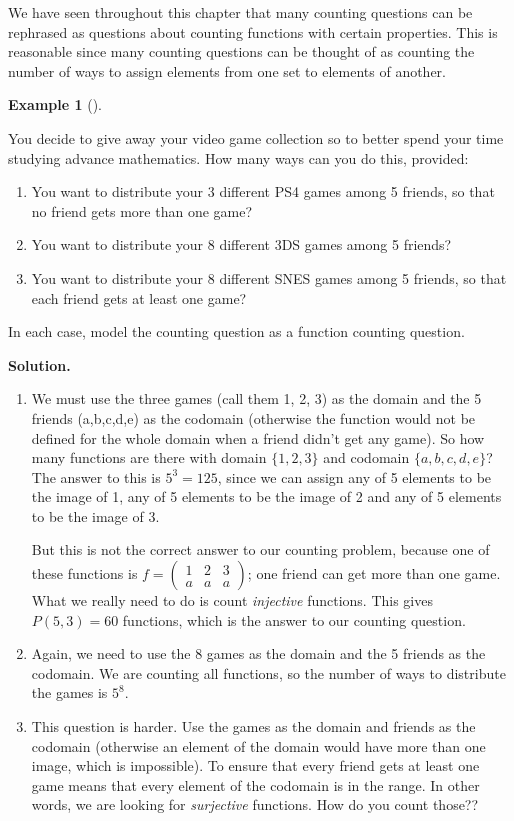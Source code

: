 \documentclass[10pt,]{book}
\theoremstyle{plain}
\theoremstyle{definition}
\newtheorem{example}[theorem]{Example}
\theoremstyle{definition}
\theoremstyle{definition}
\numberwithin{equation}{section}
\newcommand{\twoline}[2]{\begin{pmatrix}#1 \\ #2 \end{pmatrix}}
\newcommand{\amp}{ & }
\begin{document}
      We have seen throughout this chapter that many counting questions can be rephrased as questions about counting functions with certain properties.  This is reasonable since many counting questions can be thought of as counting the number of ways to assign elements from one set to elements of another.
\begin{example}[]\label{example-51}

    You decide to give away your video game collection so to better spend your time studying advance mathematics. How many ways can you do this, provided:
      \leavevmode%
\begin{enumerate}
\item\hypertarget{li-629}{}You want to distribute your 3 different PS4 games among 5 friends, so that no friend gets more than one game?%
\item\hypertarget{li-630}{}You want to distribute your 8 different 3DS games among 5 friends?%
\item\hypertarget{li-631}{}You want to distribute your 8 different SNES games among 5 friends, so that each friend gets at least one game?%
\end{enumerate}

      In each case, model the counting question as a function counting question.
\par\medskip\noindent%
\textbf{Solution.}\quad 
      \leavevmode%
\begin{enumerate}
\item\hypertarget{li-632}{}We must use the three games (call them 1, 2, 3) as the domain and the 5 friends (a,b,c,d,e) as the codomain (otherwise the function would not be defined for the whole domain when a friend didn't get any game).  So how many functions are there with domain \(\{1,2,3\}\) and codomain \(\{a,b,c,d,e\}\)?  The answer to this is \(5^3=125\), since we can assign any of 5 elements to be the image of 1, any of 5 elements to be the image of 2 and any of 5 elements to be the image of 3.%
\par

          But this is not the correct answer to our counting problem, because one of these functions is \(f= \twoline{1\amp 2\amp 3}{a\amp a\amp a}\); one friend can get more than one game.  What we really need to do is count \emph{injective} functions.  This gives \(P(5,3) = 60\) functions, which is the answer to our counting question.
\item\hypertarget{li-633}{}
        Again, we need to use the 8 games as the domain and the 5 friends as the codomain.  We are counting all functions, so the number of ways to distribute the games is \(5^8\).
\item\hypertarget{li-634}{}
        This question is harder.  Use the games as the domain and friends as the codomain (otherwise an element of the domain would have more than one image, which is impossible).  To ensure that every friend gets at least one game means that every element of the codomain is in the range.  In other words, we are looking for \emph{surjective} functions. How do you count those??
\end{enumerate}


%
\end{example}
\end{document}
